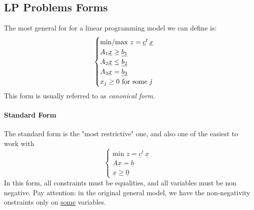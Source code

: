 \documentclass{article}
\begin{document}
		\subsection{LP Problems Forms}
			The most general for for a linear programming model we can define is:
			\begin{equation}
				\begin{cases}
					\text{min/max } z = \underline{c}^t\, \underline{x}\\
					A_1\underline{x} \geq \underline{b_1}\\
					A_2\underline{x} \leq \underline{b_2}\\
					A_3\underline{x} = \underline{b_3}\\
					x_j \geq 0 \text{ for some \emph{j}}
				\end{cases}
			\end{equation}
			This form is usually referred to as \textit{canonical form}.

			\paragraph{Standard Form}
				The standard form is the "most restrictive" one, and also one of the easiest to work with
				\begin{equation}
					\begin{cases}
						\text{min } z = \underline{c}^t\, \underline{x}\\
						A\underline{x} = \underline{b}\\
						\underline{x} \geq \underline{0} 
					\end{cases}
				\end{equation}
				In this form, all constraints must be equalities, and all variables must be non negative. Pay attention: in the original general model, we have the non-negativity onstraints only on \underline{some} variables.
\end{document}
